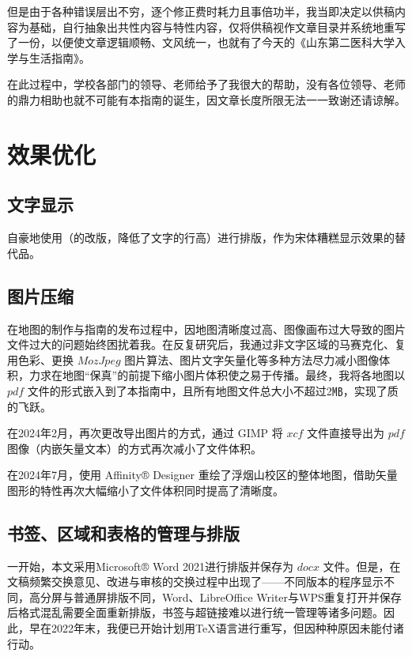但是由于各种错误层出不穷，逐个修正费时耗力且事倍功半，我当即决定以供稿内容为基础，自行抽象出共性内容与特性内容，仅将供稿视作文章目录并系统地重写了一份，以便使文章逻辑顺畅、文风统一，也就有了今天的《山东第二医科大学入学与生活指南》。

在此过程中，学校各部门的领导、老师给予了我很大的帮助，没有各位领导、老师的鼎力相助也就不可能有本指南的诞生，因文章长度所限无法一一致谢还请谅解。

\section[效果优化]{效果优化}
\subsection[文字显示]{文字显示}
自豪地使用（的改版，降低了文字的行高）进行排版，作为宋体糟糕显示效果的替代品。

\subsection[图片压缩]{图片压缩}
在地图的制作与指南的发布过程中，因地图清晰度过高、图像画布过大导致的图片文件过大\footnotemark 的问题始终困扰着我。在反复研究后，我通过非文字区域的马赛克化、复用色彩、更换 $MozJpeg$ 图片算法、图片文字矢量化等多种方法尽力减小图像体积，力求在地图“保真”的前提下缩小图片体积使之易于传播。最终，我将各地图以 $pdf$ 文件的形式嵌入到了本指南中，且所有地图文件总大小不超过2㎆，实现了质的飞跃。

在2024年2月，再次更改导出图片的方式，通过 GIMP 将 $xcf$ 文件直接导出为 $pdf$ 图像（内嵌矢量文本）的方式再次减小了文件体积。

在2024年7月，使用 Affinity® Designer 重绘了浮烟山校区的整体地图，借助矢量图形的特性再次大幅缩小了文件体积同时提高了清晰度。

\subsection[书签、区域和表格的管理与排版]{书签、区域和表格的管理与排版}
一开始，本文采用Microsoft® Word 2021进行排版并保存为 $docx$ 文件。但是，在文稿频繁交换意见、改进与审核的交换过程中出现了——不同版本的程序显示不同，高分屏与普通屏排版不同，Word、LibreOffice Writer与WPS重复打开并保存后格式混乱需要全面重新排版，书签与超链接难以进行统一管理等诸多问题。因此，早在2022年末，我便已开始计划用\TeX 语言进行重写，但因种种原因未能付诸行动。

